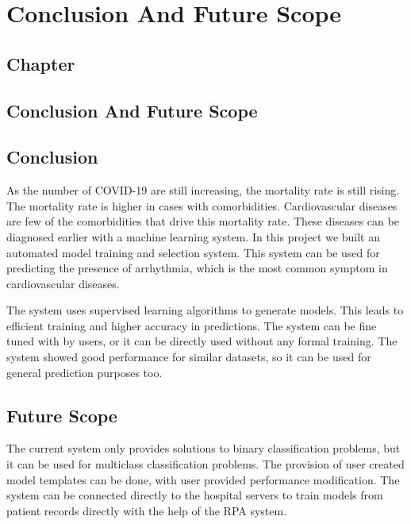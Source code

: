 \thispagestyle{fancy}
\chapter{Conclusion And Future Scope} \label{ch:conclusion_and_future_scope}
\section*{\centering Chapter \thechapter}
\section*{\centering Conclusion And Future Scope}

\section{Conclusion} \label{sec:conclusion}
As the number of COVID-19 are still increasing, the mortality rate is still rising. The mortality rate is higher in cases with comorbidities. Cardiovascular diseases are few of the comorbidities that drive this mortality rate. These diseases can be diagnosed earlier with a machine learning system. In this project we built an automated model training and selection system. This system can be used for predicting the presence of arrhythmia, which is the most common symptom in cardiovascular diseases.

The system uses supervised learning algorithms to generate models. This leads to efficient training and higher accuracy in predictions. The system can be fine tuned with by users, or it can be directly used without any formal training. The system showed good performance for similar datasets, so it can be used for general prediction purposes too.

\section{Future Scope} \label{sec:future_scope}
The current system only provides solutions to binary classification problems, but it can be used for multiclass classification problems. The provision of user created model templates can be done, with user provided performance modification. The system can be connected directly to the hospital servers to train models from patient records directly with the help of the RPA system.

